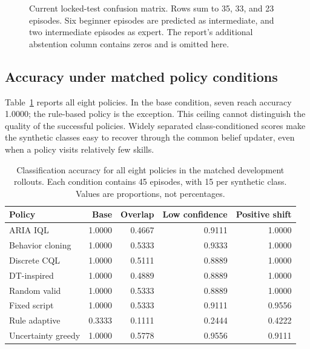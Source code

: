 \documentclass[10pt,a4paper]{article}
\begin{document}
\begin{figure}[htbp]
\centering
{}
\caption{Current locked-test confusion matrix. Rows sum to 35, 33, and 23 episodes. Six beginner episodes are predicted as intermediate, and two intermediate episodes as expert. The report's additional abstention column contains zeros and is omitted here.}
\label{fig:confusion}
\end{figure}

\subsection{Accuracy under matched policy conditions}
Table~\ref{tab:accuracy} reports all eight policies. In the base condition, seven reach accuracy 1.0000; the rule-based policy is the exception. This ceiling cannot distinguish the quality of the successful policies. Widely separated class-conditioned scores make the synthetic classes easy to recover through the common belief updater, even when a policy visits relatively few skills.

\begin{table}[htbp]
\centering\small
\caption{Classification accuracy for all eight policies in the matched development rollouts. Each condition contains 45 episodes, with 15 per synthetic class. Values are proportions, not percentages.}
\label{tab:accuracy}
\begin{tabularx}{\linewidth}{Xrrrr}
\toprule
Policy & Base & Overlap & Low confidence & Positive shift \\ \midrule
ARIA IQL & 1.0000 & 0.4667 & 0.9111 & 1.0000 \\
Behavior cloning & 1.0000 & 0.5333 & 0.9333 & 1.0000 \\
Discrete CQL & 1.0000 & 0.5111 & 0.8889 & 1.0000 \\
DT-inspired & 1.0000 & 0.4889 & 0.8889 & 1.0000 \\
Random valid & 1.0000 & 0.5333 & 0.8889 & 1.0000 \\
Fixed script & 1.0000 & 0.5333 & 0.9111 & 0.9556 \\
Rule adaptive & 0.3333 & 0.1111 & 0.2444 & 0.4222 \\
Uncertainty greedy & 1.0000 & 0.5778 & 0.9556 & 0.9111 \\
\bottomrule
\end{tabularx}
\end{table}
\end{document}
